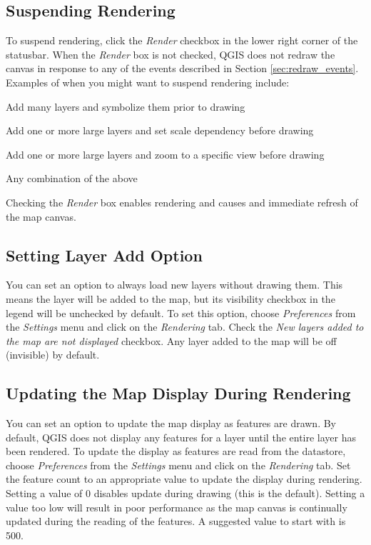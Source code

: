 \subsection{Suspending Rendering}
To suspend rendering, click the \textit{Render} checkbox in the lower right
corner of the statusbar. When the \textit{Render} box is not checked, QGIS does
not redraw the canvas in response to any of the events described in Section
\ref{sec:redraw_events}. Examples of when you might want to suspend rendering
include:
\begin{compactitem}
\item Add many layers and symbolize them prior to drawing
\item Add one or more large layers and set scale dependency before drawing
\item Add one or more large layers and zoom to a specific view before drawing
\item Any combination of the above
\end{compactitem}
Checking the \textit{Render} box enables rendering and causes and immediate
refresh of the map canvas.
\subsection{Setting Layer Add
Option}
You can set an option to always load new layers without drawing them. This means
the layer will be added to the map, but its visibility checkbox in the legend
will be unchecked by default. To set this option, choose \textit{Preferences} from the
\textit{Settings} menu and click on the \textit{Rendering} tab. Check the
\textit{New layers added to the map are not displayed} checkbox. Any layer added
to the map will be off (invisible) by default.
\subsection{Updating the Map Display During Rendering}
You can set an option to update the map display as features are drawn. By
default, QGIS does not display any features for a layer until the entire layer
has been rendered. To update the display as features are read from the
datastore, choose \textit{Preferences} from the \textit{Settings} menu and
click on the \textit{Rendering} tab. Set the feature count to an appropriate
value to update the display during rendering. Setting a value of 0 disables
update during drawing (this is the default). Setting a value too low will
result in poor performance as the map canvas is continually updated during the
reading of the features. A suggested value to start with is 500. 

